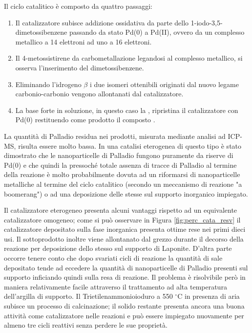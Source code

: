 \documentclass[a4paper, 12pt]{article}
\begin{document}
Il ciclo catalitico è composto da quattro passaggi:
\begin{enumerate}
	\item Il catalizzatore  subisce addizione ossidativa da parte dello 1-iodo-3,5-dimetossibenzene passando da stato Pd(0) a Pd(II), ovvero da un complesso metallico a 14 elettroni ad uno a 16 elettroni.
	\item Il 4-metossistirene da carbometallazione legandosi al complesso metallico, si osserva l'inserimento del dimetossibenzene.
	\item Eliminando l'idrogeno $\beta$ i due isomeri ottenibili originati dal nuovo legame carbonio-carbonio vengono allontanati dal catalizzatore.
	\item La base forte in soluzione, in questo caso la , ripristina il catalizzatore con Pd(0) restituendo come prodotto il composto .
\end{enumerate}

La quantità di Palladio residua nei prodotti, misurata mediante analisi ad ICP-MS, risulta essere molto bassa. In una catalisi eterogenea di questo tipo è stato dimostrato che le nanoparticelle di Palladio fungono puramente da riserve di Pd(0) e che quindi la pressoché totale assenza di tracce di Palladio al termine della reazione è molto probabilmente dovuta ad un riformarsi di nanoparticelle metalliche al termine del ciclo catalitico (secondo un meccanismo di reazione "a boomerang") o ad una deposizione delle stesse sul supporto inorganico impiegato.

Il catalizzatore eterogeneo presenta alcuni vantaggi rispetto ad un equivalente catalizzatore omogeneo; come si può osservare in Figura \ref{fig:perc_cata_resv} il catalizzatore depositato sulla fase inorganica presenta ottime rese nei primi dieci usi. Il sottoprodotto  inoltre viene allontanato dal grezzo durante il decorso della reazione per deposizione dello stesso sul supporto di Laponite. D'altra parte occorre tenere conto che dopo svariati cicli di reazione la quantità di sale depositato tende ad eccedere la quantità di nanoparticelle di Palladio presenti sul supporto inficiando quindi sulla resa di reazione. Il problema è risolvibile però in maniera relativamente facile attraverso il trattamento ad alta temperatura dell'argilla di supporto. Il Trietilenammonioioduro a 550 $^\circ$C in presenza di aria subisce un processo di calcinazione; il solido restante presenta ancora una buona attività come catalizzatore nelle reazioni e può essere impiegato nuovamente per almeno tre cicli reattivi senza perdere le sue proprietà.
\end{document}
